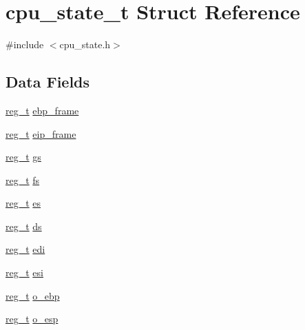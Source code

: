 \hypertarget{structcpu__state__t}{\section{cpu\-\_\-state\-\_\-t \-Struct \-Reference}
\label{structcpu__state__t}
}


{\ttfamily \#include $<$cpu\-\_\-state.\-h$>$}

\subsection*{\-Data \-Fields}
\begin{DoxyCompactItemize}
\item 
\hyperlink{types_8h_a089269ab3c13f602c75d4c7820175d67}{reg\-\_\-t} \hyperlink{structcpu__state__t_a69d91dda15fc92a6070329872fead2b1}{ebp\-\_\-frame}
\item 
\hyperlink{types_8h_a089269ab3c13f602c75d4c7820175d67}{reg\-\_\-t} \hyperlink{structcpu__state__t_a137384266091045c2336b1fd8d5e2de8}{eip\-\_\-frame}
\item 
\hyperlink{types_8h_a089269ab3c13f602c75d4c7820175d67}{reg\-\_\-t} \hyperlink{structcpu__state__t_a3c275c66dae874b988318f370e37c57c}{gs}
\item 
\hyperlink{types_8h_a089269ab3c13f602c75d4c7820175d67}{reg\-\_\-t} \hyperlink{structcpu__state__t_ac75642639a79d74455af58d5a45932c2}{fs}
\item 
\hyperlink{types_8h_a089269ab3c13f602c75d4c7820175d67}{reg\-\_\-t} \hyperlink{structcpu__state__t_a4efb520b83ac96614301f0cff941be2d}{es}
\item 
\hyperlink{types_8h_a089269ab3c13f602c75d4c7820175d67}{reg\-\_\-t} \hyperlink{structcpu__state__t_afb3e0ecb46bbcd9446b2d2b92af6908e}{ds}
\item 
\hyperlink{types_8h_a089269ab3c13f602c75d4c7820175d67}{reg\-\_\-t} \hyperlink{structcpu__state__t_a381129dc13b5515ebe6c894d270106a5}{edi}
\item 
\hyperlink{types_8h_a089269ab3c13f602c75d4c7820175d67}{reg\-\_\-t} \hyperlink{structcpu__state__t_a2830de4c04946b1ab58751997e5586c5}{esi}
\item 
\hyperlink{types_8h_a089269ab3c13f602c75d4c7820175d67}{reg\-\_\-t} \hyperlink{structcpu__state__t_a655550b9a94213fbf44a1331891ca824}{o\-\_\-ebp}
\item 
\hyperlink{types_8h_a089269ab3c13f602c75d4c7820175d67}{reg\-\_\-t} \hyperlink{structcpu__state__t_a168ec183f497b544b52993eb20bbf649}{o\-\_\-esp}
\item 

\end{DoxyCompactItemize}
